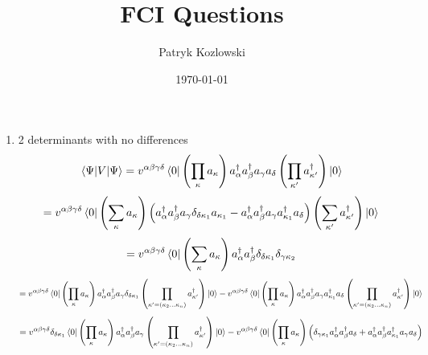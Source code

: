 \documentclass[12pt]{article}
\title{FCI Questions}
\author{Patryk Kozlowski}
\date{\today} %
\begin{document}
    \maketitle
\begin{enumerate}
    \item 2 determinants with no differences
    \begin{dmath}
        \mel{\Psi}{V}{\Psi}=v^{\alpha\beta\gamma\delta}\bra{0}\left(\prod_{\kappa}^{}a_{\kappa}\right)a^{\dag}_{\alpha}a^{\dag}_{\beta}a_{\gamma}a_{\delta}
        \left(\prod_{\kappa^{\prime}}^{}a^{\dag}_{\kappa^{\prime}}\right)\ket{0}
    \end{dmath}
    \begin{dmath}
        =v^{\alpha\beta\gamma\delta}\bra{0}\left(\sum_{\kappa}a_{\kappa}\right)\left(a^{\dag}_{\alpha}a^{\dag}_{\beta}a_{\gamma}\delta_{\delta\kappa_{1}}a_{\kappa_{1}}-a^{\dag}_{\alpha}a^{\dag}_{\beta}a_{\gamma}a^{\dag}_{\kappa_{1}}a_{\delta}\right)\left(\sum_{\kappa^{\prime}}a^{\dag}_{\kappa^{\prime}}\right)\ket{0}
    \end{dmath}
    \begin{dmath}
        =v^{\alpha\beta\gamma\delta}\bra{0}\left(\sum_{\kappa}a_{\kappa}\right)a^{\dag}_{\alpha}a^{\dag}_{\beta}\delta_{\delta\kappa_{1}}\delta_{\gamma\kappa_{2}}
    \end{dmath}
    \begin{dmath}
    =v^{\alpha\beta\gamma\delta}\bra{0}\left(\prod_{\kappa}^{}a_{\kappa}\right)a^{\dag}_{\alpha}a^{\dag}_{\beta}a_{\gamma}\delta_{\delta\kappa_{1}}
    \left(\prod_{\kappa^{\prime}=\left(\kappa_{2}\dots\kappa_{n}\right)}^{}
    a^{\dag}_{\kappa^{\prime}}\right)\ket{0}
    -v^{\alpha\beta\gamma\delta}\bra{0}\left(\prod_{\kappa}^{}a_{\kappa}\right)a^{\dag}_{\alpha}a^{\dag}_{\beta}a_{\gamma}a^{\dag}_{\kappa_{1}}a_{\delta}
    \left(\prod_{\kappa^{\prime}=\left(\kappa_{2}\dots\kappa_{n}\right)}^{}
    a^{\dag}_{\kappa^{\prime}}\right)\ket{0}
    \end{dmath}
    \begin{dmath}
    =v^{\alpha\beta\gamma\delta}\delta_{\delta\kappa_{1}}\bra{0}\left(\prod_{\kappa}^{}a_{\kappa}\right)a^{\dag}_{\alpha}a^{\dag}_{\beta}a_{\gamma}
    \left(\prod_{\kappa^{\prime}=\left(\kappa_{2}\dots\kappa_{n}\right)}^{}
    a^{\dag}_{\kappa^{\prime}}\right)\ket{0}
        -v^{\alpha\beta\gamma\delta}\bra{0}\left(\prod_{\kappa}^{}a_{\kappa}\right)\left(\delta_{\gamma\kappa_{1}}a^{\dag}_{\alpha}a^{\dag}_{\beta}a_{\delta}+a^{\dag}_{\alpha}a^{\dag}_{\beta}a^{\dag}_{\kappa_{1}}a_{\gamma}a_{\delta}\right)

\end{dmath}
\end{enumerate}
\end{document}
